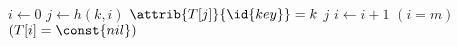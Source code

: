 \begin{codebox}
\li $i \gets 0$
\li \Repeat 
\li     $j \gets h(k,i)$
\li     \If $\attrib{T[j]}{\id{key}} = k$
\li         \Then
                \Return $j$
            \End
\li     $i \gets i + 1$
\li \Until $(i = m)$  $(T[i] = \const{nil})$
\li \Return {}
\end{codebox}